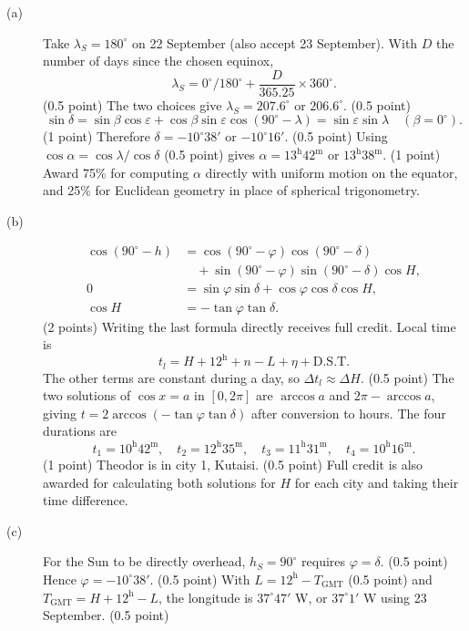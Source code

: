 \begin{description}
\item[(a)] Take $\lambda_S=180^\circ$ on 22 September (also accept 23 September). With $D$ the number of days since the chosen equinox,
\[
\lambda_S=0^\circ/180^\circ+\frac{D}{365.25}\times360^\circ.
\]\hfill(0.5 point)
The two choices give $\lambda_S=207.6^\circ$ or $206.6^\circ$. \hfill(0.5 point)
\[
\sin\delta=\sin\beta\cos\varepsilon+\cos\beta\sin\varepsilon\cos(90^\circ-\lambda)
=\sin\varepsilon\sin\lambda\quad(\beta=0^\circ).
\]\hfill(1 point)
Therefore $\delta=-10^\circ38'$ or $-10^\circ16'$. \hfill(0.5 point)
Using $\cos\alpha=\cos\lambda/\cos\delta$ \hfill(0.5 point)
gives $\alpha=13^{\mathrm h}42^{\mathrm m}$ or $13^{\mathrm h}38^{\mathrm m}$. \hfill(1 point)
Award 75\% for computing $\alpha$ directly with uniform motion on the equator, and 25\% for Euclidean geometry in place of spherical trigonometry.
\item[(b)]
\begin{align*}
\cos(90^\circ-h)&=\cos(90^\circ-\varphi)\cos(90^\circ-\delta)\\
&\quad+\sin(90^\circ-\varphi)\sin(90^\circ-\delta)\cos H,\\
0&=\sin\varphi\sin\delta+\cos\varphi\cos\delta\cos H,\\
\cos H&=-\tan\varphi\tan\delta.
\end{align*}\hfill(2 points)
Writing the last formula directly receives full credit. Local time is
\[
t_l=H+12^{\mathrm h}+n-L+\eta+\mathrm{D.S.T.}
\]
The other terms are constant during a day, so $\Delta t_l\approx\Delta H$. \hfill(0.5 point)
The two solutions of $\cos x=a$ in $[0,2\pi]$ are $\arccos a$ and $2\pi-\arccos a$, giving $t=2\arccos(-\tan\varphi\tan\delta)$ after conversion to hours. The four durations are
\[
t_1=10^{\mathrm h}42^{\mathrm m},\quad t_2=12^{\mathrm h}35^{\mathrm m},\quad
 t_3=11^{\mathrm h}31^{\mathrm m},\quad t_4=10^{\mathrm h}16^{\mathrm m}.
\]\hfill(1 point)
Theodor is in city 1, Kutaisi. \hfill(0.5 point)
Full credit is also awarded for calculating both solutions for $H$ for each city and taking their time difference.
\item[(c)] For the Sun to be directly overhead, $h_S=90^\circ$ requires $\varphi=\delta$. \hfill(0.5 point)
Hence $\varphi=-10^\circ38'$. \hfill(0.5 point)
With $L=12^{\mathrm h}-T_{\mathrm{GMT}}$ \hfill(0.5 point)
and $T_{\mathrm{GMT}}=H+12^{\mathrm h}-L$, the longitude is $37^\circ47'$ W, or $37^\circ1'$ W using 23 September. \hfill(0.5 point)
\end{description}
